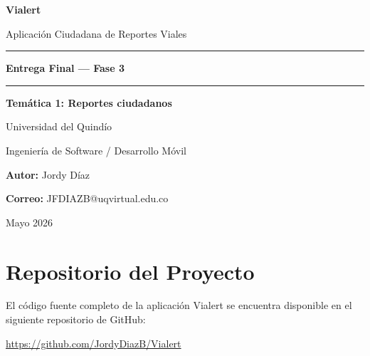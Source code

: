 \documentclass[12pt,a4paper]{article}
\begin{document}
\begin{titlepage}
    \centering
    \vspace*{2cm}
    {\huge\bfseries\color{primary} Vialert\par}
    \vspace{0.4cm}
    {\large\color{gray} Aplicación Ciudadana de Reportes Viales\par}
    \vspace{1.5cm}
    \rule{\textwidth}{1.5pt}\par
    \vspace{0.3cm}
    {\LARGE\bfseries Entrega Final --- Fase 3\par}
    \vspace{0.3cm}
    \rule{\textwidth}{1.5pt}\par
    \vspace{1.5cm}
    {\large\textbf{Temática 1: Reportes ciudadanos}\par}
    \vspace{0.5cm}
    {\large Universidad del Quindío\par}
    {\large Ingeniería de Software / Desarrollo Móvil\par}
    \vspace{1.5cm}
    {\large\textbf{Autor:} Jordy Díaz\par}
    \vspace{0.3cm}
    {\large\textbf{Correo:} JFDIAZB@uqvirtual.edu.co\par}
    \vfill
    {\large Mayo 2026\par}
\end{titlepage}

\tableofcontents
\newpage

\section{Repositorio del Proyecto}

El código fuente completo de la aplicación Vialert se encuentra disponible en el siguiente repositorio de GitHub:

\begin{center}
    \colorbox{secondary}{\parbox{0.85\textwidth}{\centering\vspace{6pt}
        \url{https://github.com/JordyDiazB/Vialert}
    \vspace{6pt}}}
\end{center}
\end{document}
